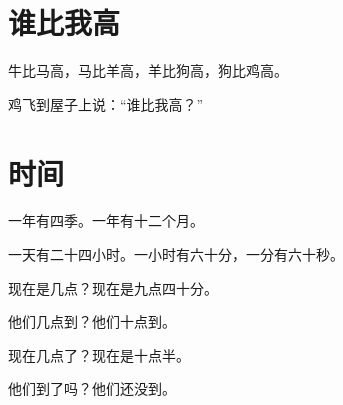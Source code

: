 \documentclass[12pt,UTF-8,openany]{ctexbook}
\begin{document}
\hanzibox{}\hanzibox{}\hanzibox{}\hanzibox{}\hspace{1em}\hanzibox{}\hanzibox{}\hanzibox{}\hanzibox{}

\hanzibox{}\hanzibox{}\hanzibox{}\hanzibox{}\hspace{1em}\hanzibox{}\hanzibox{}\hanzibox{}\hanzibox{}

\hanzibox{}\hanzibox{}\hanzibox{}\hanzibox{}\hspace{1em}




\chapter{谁比我高}

\begin{large}
    
    牛比马高，马比羊高，羊比狗高，狗比鸡高。
    
    鸡飞到屋子上说：“谁比我高？”
    
\end{large}


\clearpage

\begin{center}
    
\end{center}


\hanzibox{}\hanzibox{}\hanzibox{}\hanzibox{}\hspace{1em}\hanzibox{}\hanzibox{}\hanzibox{}\hanzibox{}

\hanzibox{}\hanzibox{}\hanzibox{}\hanzibox{}\hspace{1em}\hanzibox{}\hanzibox{}\hanzibox{}\hanzibox{}

\hanzibox{}\hanzibox{}\hanzibox{}\hanzibox{}\hspace{1em}




\chapter{时间}

\begin{large}
    
    一年有四季。一年有十二个月。
    
    一天有二十四小时。一小时有六十分，一分有六十秒。
    
    现在是几点？现在是九点四十分。
    
    他们几点到？他们十点到。
    
    现在几点了？现在是十点半。
    
    他们到了吗？他们还没到。
    
\end{large}
\end{document}
